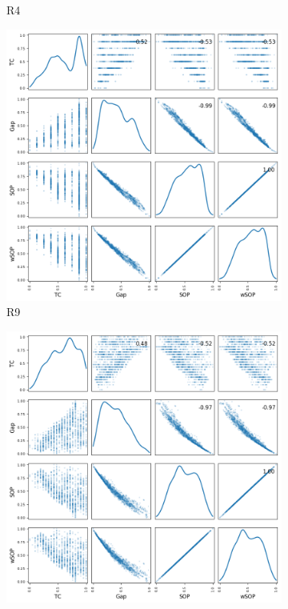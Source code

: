 \begin{figure}[!htbp]
\begin{adjustwidth}{-1cm}{-1cm}
\begin{subfigure}{0.35\textwidth}
			\caption{R4}
		\end{subfigure}
		\begin{subfigure}{0.35\textwidth}
			\includegraphics[width=\columnwidth]{Figure/NumGaps_SOP_TC_wSOP/precomputedInit/R9/fig/scatter_mattrix}
			\caption{R9}
		\end{subfigure}
		\begin{subfigure}{0.35\textwidth}
			\includegraphics[width=\columnwidth]{Figure/NumGaps_SOP_TC_wSOP/precomputedInit/R14/fig/scatter_mattrix}

\end{subfigure}
\end{adjustwidth}
\end{figure}
